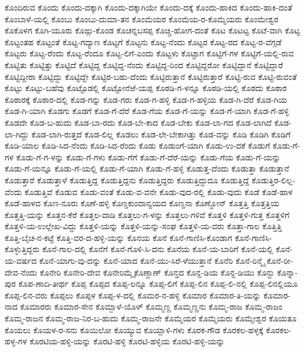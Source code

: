 ಕೊಂದಿರುವ
ಕೊಂದು
ಕೊಂದು-ದಕ್ಕಾಗಿ
ಕೊಂದು-ದಕ್ಕಾಗಿಯೇ
ಕೊಂದು-ದಕ್ಕೆ
ಕೊಂದು-ಹಾಕಿದ
ಕೊಂದು-ಹಾಕಿ-ದಂತೆ
ಕೊಂಬಾಳೆ-ಯಲ್ಲಿ
ಕೊಂಬು
ಕೊಂಬು-ದುಮಾ-ತನ
ಕೊಂಮೆಯರ
ಕೊಂಮೆಯ-ರ-ಕೊಮ್ಮೆಯರು
ಕೊಂಮೇಶ್ವರ
ಕೊಕೊಳಗ
ಕೊಗಿ-ಯೂರು
ಕೊಙ್ಗು-ಕೊಂಡ
ಕೊಚನ್ನಬಸಪ್ಪ
ಕೊಚ್ಚಿ-ಹೋಗ-ದಂತೆ
ಕೊಟ
ಕೊಟಟ್ಟ
ಕೊಟೆ-ವಾಗಿ
ಕೊಟ್ಟ
ಕೊಟ್ಟಂತಹ
ಕೊಟ್ಟಂತೆ
ಕೊಟ್ಟ-ಗದ್ಯಾಣ
ಕೊಟ್ಟಗೆ
ಕೊಟ್ಟನು
ಕೊಟ್ಟ-ನೆಂದು
ಕೊಟ್ಟರ
ಕೊಟ್ಟ-ರದ
ಕೊಟ್ಟ-ರ-ವೆಗ್ಗಡೆ
ಕೊಟ್ಟರು
ಕೊಟ್ಟ-ರೆಂದು
ಕೊಟ್ಟ-ರೆಂದೂ
ಕೊಟ್ಟ-ಲಿಗೆ-ಎಂದು
ಕೊಟ್ಟಳು
ಕೊಟ್ಟಾಗ
ಕೊಟ್ಟಿಗೆ-ಗಳ
ಕೊಟ್ಟಿಗೆ-ಯಲ್ಲಿ-ರುವ
ಕೊಟ್ಟಿತು
ಕೊಟ್ಟಿತ್ತು
ಕೊಟ್ಟಿದೆ
ಕೊಟ್ಟಿದ್ದ
ಕೊಟ್ಟಿದ್ದ-ನೆಂದು
ಕೊಟ್ಟಿದ್ದ-ರಿಂದ
ಕೊಟ್ಟಿದ್ದರೋ
ಕೊಟ್ಟಿದ್ದಾನೆ
ಕೊಟ್ಟಿದ್ದಾರೆ
ಕೊಟ್ಟಿದ್ದೀರಾ
ಕೊಟ್ಟಿದ್ದು
ಕೊಟ್ಟಿದ್ದೇ
ಕೊಟ್ಟಿರ-ಬಹು-ದೆಂದು
ಕೊಟ್ಟಿರುತ್ತಾನೆ
ಕೊಟ್ಟಿರುತ್ತಾರೆ
ಕೊಟ್ಟಿ-ರುವ
ಕೊಟ್ಟಿ-ರುವಂತೆ
ಕೊಟ್ಟು
ಕೊಟ್ಟು-ಬಹೆವು
ಕೊಟ್ಟೊಡಲ್ಲಿ
ಕೊಟ್ಟೋನೆಱೆ-ಯಪ್ಪ
ಕೊಠಡಿ-ಗ-ಳನ್ನೂ
ಕೊಠಡಿ-ಯಲ್ಲಿ
ಕೊಠದು
ಕೊಠಾರ
ಕೊಠಾರಕ್ಕೆ
ಕೊಠಾರ-ದಲ್ಲಿ
ಕೊಡ-ಗನ್ನು
ಕೊಡ-ಗರು
ಕೊಡ-ಗ-ಹಳ್ಳಿ
ಕೊಡ-ಗ-ಹಳ್ಳಿಯ
ಕೊಡ-ಗಿ-ದೆರೆ
ಕೊಡ-ಗಿಯ
ಕೊಡ-ಗಿ-ಯಾಗಿ
ಕೊಡಗು
ಕೊಡಗೆ
ಕೊಡ-ಗೆ-ದೆರೆ
ಕೊಡ-ಗೆಯ
ಕೊಡ-ಗೆ-ಯನ್ನು
ಕೊಡ-ಗೆ-ಯಾಗಿ
ಕೊಡ-ಗೆ-ಹಳ್ಳಿ
ಕೊಡದೇ
ಕೊಡ-ಬ-ಹುದು
ಕೊಡ-ಬಾ-ರದು
ಕೊಡ-ಬೇ-ಕಾದ
ಕೊಡ-ಬೇಕು
ಕೊಡ-ಲಾ-ಗದ
ಕೊಡ-ಲಾಗಿದೆ
ಕೊಡ-ಲಾ-ಗಿದ್ದು
ಕೊಡ-ಲಾಗಿ-ರುತ್ತದೆ
ಕೊಡ-ಲಿಲ್ಲ
ಕೊಡಲು
ಕೊಡ-ಲೇ-ಬೇಕಾಗಿತ್ತು
ಕೊಡ-ವನ್ನು
ಕೊಡಿ
ಕೊಡಿಗಿ
ಕೊಡಿಗೆ
ಕೊಡಿ-ಯಾಲ
ಕೊಡಿ-ಸಿದ-ನೆಂದು
ಕೊಡಿ-ಸಿದ-ರೆಂದು
ಕೊಡು
ಕೊಡುಂಗೆ-ಯಾಗಿ
ಕೊಡು-ಉ-ದಕೆ
ಕೊಡುಗೆ
ಕೊಡು-ಗೆ-ಗಳ
ಕೊಡು-ಗೆ-ಗ-ಳನ್ನು
ಕೊಡು-ಗೆ-ಗಳು
ಕೊಡು-ಗೆಗೆ
ಕೊಡು-ಗೆ-ದೆರೆ-ಯನ್ನು
ಕೊಡು-ಗೆಯ
ಕೊಡು-ಗೆ-ಯನ್ನು
ಕೊಡು-ಗೆ-ಯನ್ನೂ
ಕೊಡು-ಗೆ-ಯಲ್ಲಿ
ಕೊಡು-ಗೆ-ಯಾಗಿ
ಕೊಡು-ಗೆ-ಹಳ್ಳಿ
ಕೊಡುತ್ತ-ದೆಂದು
ಕೊಡುತ್ತಾ
ಕೊಡುತ್ತಾನೆ
ಕೊಡುತ್ತಾರೆ
ಕೊಡುತ್ತಾಳೆ
ಕೊಡುತ್ತಿದ್ದ
ಕೊಡುತ್ತಿದ್ದನು
ಕೊಡುತ್ತಿದ್ದರು
ಕೊಡುತ್ತಿದ್ದುದೂ
ಕೊಡುತ್ತಿದ್ದೆ
ಕೊಡುತ್ತಿರ-ಲಿಲ್ಲ-ವೆಂದು
ಕೊಡುತ್ತಿವೆ
ಕೊಡುವ
ಕೊಡು-ವಂತೆ
ಕೊಡು-ವ-ವನೇ
ಕೊಡು-ವುದ-ರಲ್ಲಿ
ಕೊಡು-ವುದು
ಕೊಡೆ
ಕೊಡೆ-ಹಾಳ
ಕೊಡೆ-ಹಾಳದ
ಕೊಣ-ನೂರು
ಕೊಣೆ-ಹಳ್ಳಿ
ಕೊಣ್ಡಕುಂದಾನ್ವಯದ
ಕೊಣ್ಡನಾ
ಕೊಣ್ಡೋನ್
ಕೊತ್ತತ್ತಿ
ಕೊತ್ತತ್ತಿಯ
ಕೊತ್ತತ್ತಿ-ಯನ್ನು
ಕೊತ್ತನ-ಕೆರೆ
ಕೊತ್ತಲ-ವಾಡಿ
ಕೊತ್ತಲು-ಗ-ಳನ್ನು
ಕೊತ್ತಲು-ಗಳಿವೆ
ಕೊತ್ತಳಿ
ಕೊತ್ತಳಿ-ಗುತ್ತ
ಕೊತ್ತಳಿಗೆ
ಕೊತ್ತಳಿ-ಯ-ಉಲ್ಲೇಖ-ವಿದ್ದು
ಕೊತ್ತಳಿ-ಯನ್ನು
ಕೊತ್ತಳಿ-ಯನ್ನು-ಸಂಘ
ಕೊತ್ತಳಿ-ಯ-ವರು
ಕೊತ್ತಾ-ಗಾಲ
ಕೊತ್ತಿತ್ತಿ
ಕೊತ್ತಿ-ಬೈಚ-ನ-ಕಟ್ಟೆ
ಕೊತ್ತಿ-ವರ-ದ-ಹಳ್ಳಿ-ಯನ್ನು
ಕೊನಯ
ಕೊನೆ
ಕೊನೆ-ಗಾಣಿಸಿ-ಕೊಂಡಾಗ
ಕೊನೆ-ಗಾಣಿಸಿ-ಕೊಳ್ಳುತ್ತಿದ್ದರು
ಕೊನೆ-ಗಾಲ-ದಲ್ಲಿ
ಕೊನೆಗೆ
ಕೊನೆ-ಗೊಳಿ-ಸಿ-ದನು
ಕೊನೆಯ
ಕೊನೆ-ಯ-ಬಾರಿಗೆ
ಕೊನೆ-ಯಲ್ಲಿ
ಕೊನೆ-ಯ-ವರ್ಷದ
ಕೊನೆ-ಯಾಗು-ವು-ದನ್ನು
ಕೊನೆ-ಯಾದ
ಕೊನೆ-ಯು-ಸಿರೆ-ಳೆಯುತ್ತಾನೆ
ಕೊನೆರಿ
ಕೊನೆ-ರಿನ್ಮೈ
ಕೊನೆ-ರೀ-ದೇವ-ನೆಂದು
ಕೊನೇರಿ
ಕೊನೇರಿ-ದೇವ
ಕೊನೇರಿಮ್ಮೈಕೊಣ್ಡಾಣ್
ಕೊನ್ತದ
ಕೊನ್ದ-ಡಿಯ
ಕೊನ್ದ-ಡಿಯು
ಕೊನ್ದು
ಕೊನ್ನಾ-ಪುರ
ಕೊಪ-ಣಾದಿ-ತೀರ್ಥ
ಕೊಪ್ಪ
ಕೊಪ್ಪದ
ಕೊಪ್ಪ-ಲನ್ನೂ
ಕೊಪ್ಪ-ಲಿಗೆ
ಕೊಪ್ಪ-ಲಿನ
ಕೊಪ್ಪ-ಲಿ-ನಲ್ಲಿ
ಕೊಪ್ಪ-ಲಿನಲ್ಲಿಯೂ
ಕೊಪ್ಪ-ಲಿನ-ವರು
ಕೊಪ್ಪಲು
ಕೊಪ್ಪಳ
ಕೊಪ್ಪ-ಳ-ದಲ್ಲಿ
ಕೊಮರ-ನ-ಹಳ್ಳಿ
ಕೊಮಾರ
ಕೊಮಾರ-ತಿ-ಯನ್ನು
ಕೊಮಾರ-ನಾದ
ಕೊಮಾರರು
ಕೊಮಾರ-ಸೇನ
ಕೊಮ್ಬಾಳೆ-ಯೊಳ್
ಕೊಮ್ಮಣ್ಣ
ಕೊಮ್ಮಣ್ಣನು
ಕೊಮ್ಮ-ರಾಜ
ಕೊಮ್ಮ-ರಾಜಂ
ಕೊಮ್ಮ-ರಾಜನ
ಕೊಮ್ಮ-ರಾಜ-ನಿರ-ಬ-ಹುದು
ಕೊಮ್ಮ-ರಾಜನೇ
ಕೊಮ್ಮೆಯರ
ಕೊಮ್ಮೆಯರು
ಕೊಮ್ಮೇಶ್ವರ
ಕೊಯತೂ
ಕೊಯಲು
ಕೊಯಳ-ರ-ಸನು
ಕೊಯಿಲೋ
ಕೊಯ್ಯುವ
ಕೊಯ್ಲಾಳಿ-ಗಳು
ಕೊರಕ-ಗೌಡ
ಕೊರಕಲ-ಹಳ್ಳಕ್ಕೆ
ಕೊರಕಲ-ಹಳ್ಳ-ಗಳ
ಕೊರಟಿಯ-ಹಳ್ಳಿ-ಯನ್ನು
ಕೊರಟಿ-ಹಳ್ಳಿ
ಕೊರಟಿ-ಹಳ್ಳಿಯ
ಕೊರಟಿ-ಹಳ್ಳಿ-ಯನ್ನು
